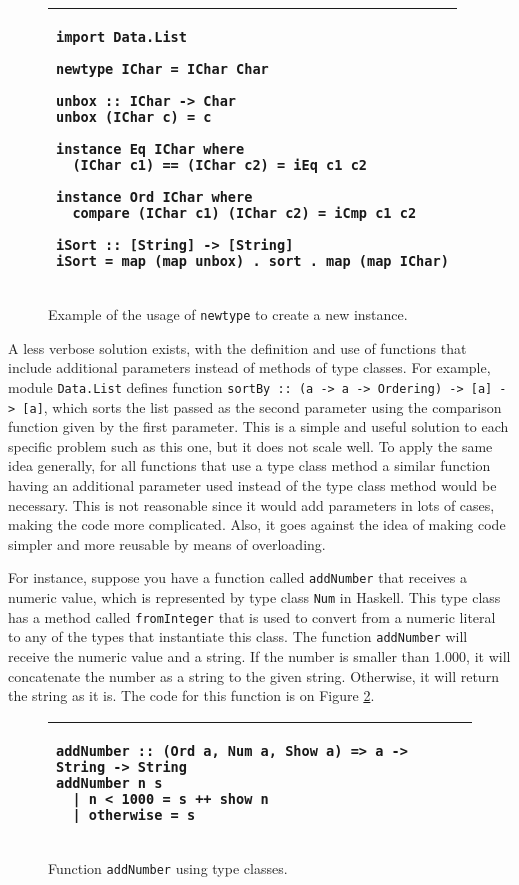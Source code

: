 \documentclass[msc]{ppgccufmg}
\begin{document}
\begin{figure}
\caption{Example of the usage of \texttt{newtype} to create a new
  instance.\label{newtype}}
\begin{tabular}{|p{\textwidth}|}
\hline
\begin{verbatim}
import Data.List

newtype IChar = IChar Char

unbox :: IChar -> Char
unbox (IChar c) = c

instance Eq IChar where
  (IChar c1) == (IChar c2) = iEq c1 c2

instance Ord IChar where
  compare (IChar c1) (IChar c2) = iCmp c1 c2

iSort :: [String] -> [String]
iSort = map (map unbox) . sort . map (map IChar)
\end{verbatim}
\\
\hline
\end{tabular}
\end{figure}

A less verbose solution exists, with the definition and use of
functions that include additional parameters instead of methods of
type classes. For example, module \texttt{Data.List} defines function
\texttt{sortBy :: (a -> a -> Ordering) -> [a] -> [a]}, which sorts the
list passed as the second parameter using the comparison function
given by the first parameter.  This is a simple and useful solution to
each specific problem such as this one, but it does not scale well.  To apply the same
idea generally, for all functions that use a type class method a
similar function having an additional parameter used instead of the
type class method would be necessary. This is not reasonable since it would add parameters in lots of cases, making the code
more complicated.  Also, it goes against the idea of making code
simpler and more reusable by means of overloading.

For instance, suppose you have a function called \texttt{addNumber} that receives a numeric value, which is represented by type class \texttt{Num} in Haskell.
This type class has a method called \texttt{fromInteger} that is used to convert from a numeric literal to any of the types that instantiate this class.
The function \texttt{addNumber} will receive the numeric value and a string.
If the number is smaller than 1.000, it will concatenate the number as a string to the given string.
Otherwise, it will return the string as it is.
The code for this function is on Figure \ref{classExample}.

\begin{figure}
\caption{Function \texttt{addNumber} using type classes.\label{classExample}}
\begin{tabular}{|p{\textwidth}|}
\hline
\begin{verbatim}
addNumber :: (Ord a, Num a, Show a) => a -> String -> String
addNumber n s
  | n < 1000 = s ++ show n
  | otherwise = s
\end{verbatim}
\\
\hline
\end{tabular}
\end{figure}
\end{document}
